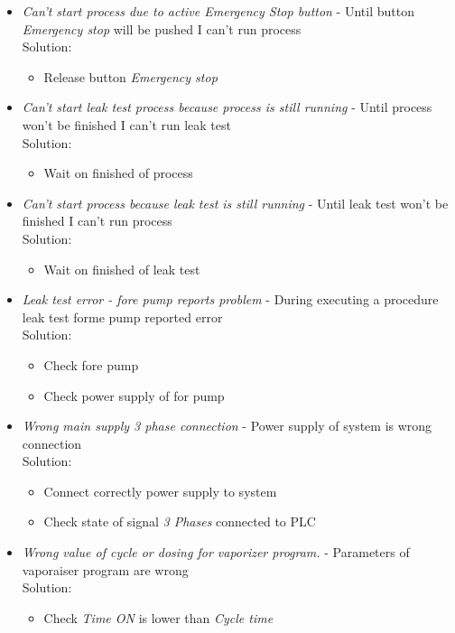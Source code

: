 \begin{itemize}
	\item \textit{Can't start process due to active Emergency Stop button} - Until button \textit{Emergency stop} will be pushed I can't run process  \\
 		Solution:
		\begin{itemize}
			\item Release button \textit{Emergency stop}
		\end{itemize}

	\item \textit{Can't start leak test process because process is still running}  - Until process won't be finished I can't run leak test\\
 		Solution:
		\begin{itemize}
			\item Wait on finished of process
		\end{itemize}

	\item \textit{Can't start process because leak test is still running} - Until leak test won't be finished I can't run process\\
 		Solution:
		\begin{itemize}
			\item Wait on finished of leak test
		\end{itemize}
	
	\item \textit{Leak test error - fore pump reports problem} - During executing a procedure leak test forme pump reported error \\
 		Solution:
		\begin{itemize}
			\item Check fore pump 
			\item Check power supply of for pump
		\end{itemize}

	\item \textit{Wrong main supply 3 phase connection} - Power supply of system is wrong connection \\
 		Solution:
		\begin{itemize}
			 \item Connect correctly power supply to system 
			\item Check state of signal \textit{3 Phases} connected to PLC
		\end{itemize}
	
	\item \textit{Wrong value of cycle or dosing  for vaporizer program.} - Parameters of vaporaiser program are wrong  \\
 		Solution:
		\begin{itemize}
			\item Check \textit{Time ON} is lower  than \textit{Cycle time} 
		\end{itemize}


\end{itemize}
